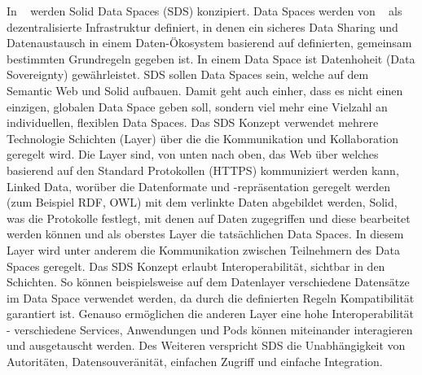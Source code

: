 \documentclass[acmtog]{acmart}
\begin{document}

In ~\cite{meckler2023web} werden Solid Data Spaces (SDS) konzipiert.
Data Spaces werden von ~\cite{nagel2021design} als dezentralisierte Infrastruktur definiert, in denen ein sicheres Data Sharing und Datenaustausch in einem Daten-Ökosystem basierend auf definierten, gemeinsam bestimmten Grundregeln gegeben ist. In einem Data Space ist Datenhoheit (Data Sovereignty) gewährleistet.
SDS sollen Data Spaces sein, welche auf dem Semantic Web und Solid aufbauen. Damit geht auch einher, dass es nicht einen einzigen, globalen Data Space geben soll, sondern viel mehr eine Vielzahl an individuellen, flexiblen Data Spaces.
Das SDS Konzept verwendet mehrere Technologie Schichten (Layer) über die die Kommunikation und Kollaboration geregelt wird. Die Layer sind, von unten nach oben, das Web über welches basierend auf den Standard Protokollen (HTTPS) kommuniziert werden kann, Linked Data, worüber die Datenformate und -repräsentation geregelt werden (zum Beispiel RDF, OWL) mit dem verlinkte Daten abgebildet werden, Solid, was die Protokolle festlegt, mit denen auf Daten zugegriffen und diese bearbeitet werden können und als oberstes Layer die tatsächlichen Data Spaces. In diesem Layer wird unter anderem die Kommunikation zwischen Teilnehmern des Data Spaces geregelt. Das SDS Konzept erlaubt Interoperabilität, sichtbar in den Schichten. So können beispielsweise auf dem Datenlayer verschiedene Datensätze im Data Space verwendet werden, da durch die definierten Regeln Kompatibilität garantiert ist. Genauso ermöglichen die anderen Layer eine hohe Interoperabilität - verschiedene Services, Anwendungen und Pods können miteinander interagieren und ausgetauscht werden. Des Weiteren verspricht SDS die Unabhängigkeit von Autoritäten, Datensouveränität, einfachen Zugriff und einfache Integration.
\end{document}
